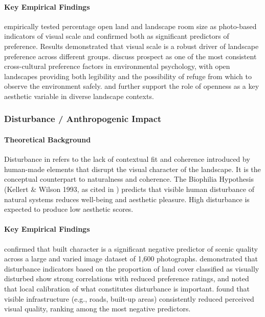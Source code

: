 \documentclass[hidelinks, 11pt]{article}
\begin{document}
\paragraph{Key Empirical Findings}
\citet{ode_indicators_2009} empirically tested percentage open land and landscape room size as photo-based indicators of visual scale and confirmed both as significant predictors of preference. Results demonstrated that visual scale is a robust driver of landscape preference across different groups. \citet{kaplan_experience_1989} discuss prospect as one of the most consistent cross-cultural preference factors in environmental psychology, with open landscapes providing both legibility and the possibility of refuge from which to observe the environment safely. \citet{clay_assessing_2004} and \citet{hanyu_degree_nodate} further support the role of openness as a key aesthetic variable in diverse landscape contexts.

\subsubsection{Disturbance / Anthropogenic Impact}\label{sec:DAI}
\paragraph{Theoretical Background}
Disturbance in \citet{ode_capturing_2008} refers to the lack of contextual fit and coherence introduced by human-made elements that disrupt the visual character of the landscape. It is the conceptual counterpart to naturalness and coherence. The Biophilia Hypothesis (Kellert \& Wilson 1993, as cited in \citet{tveit_key_2006}) predicts that visible human disturbance of natural systems reduces well-being and aesthetic pleasure. High disturbance is expected to produce low aesthetic scores.

\paragraph{Key Empirical Findings}
\citet{van_der_jagt_unearthing_2014} confirmed that built character is a significant negative predictor of scenic quality across a large and varied image dataset of 1,600 photographs. \citet{gulinck_framework_2001} demonstrated that disturbance indicators based on the proportion of land cover classified as visually disturbed show strong correlations with reduced preference ratings, and noted that local calibration of what constitutes disturbance is important. \citet{arriaza_assessing_2004} found that visible infrastructure (e.g., roads, built-up areas) consistently reduced perceived visual quality, ranking among the most negative predictors.
\end{document}
